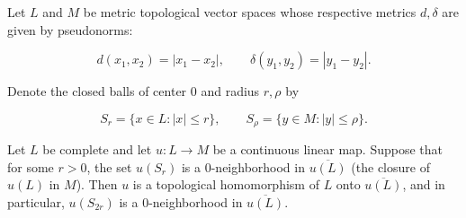 Let $L$ and $M$ be metric topological vector spaces whose respective metrics $d, \delta$ are given by pseudonorms:

$$d(x_1, x_2) = |x_1 - x_2|, \qquad \delta(y_1, y_2) = |y_1 - y_2|.$$

Denote the closed balls of center $0$ and radius $r, \rho$ by

$$S_r = \{x \in L: |x| \leq r\}, \qquad S_\rho = \{y \in M: |y| \leq \rho\}.$$

Let $L$ be complete and let $u: L \to M$ be a continuous linear map. Suppose that for some $r > 0$, the set $u(S_r)$ is a $0$-neighborhood in $\overline{u(L)}$ (the closure of $u(L)$ in $M$). Then $u$ is a topological homomorphism of $L$ onto $\overline{u(L)}$, and in particular, $u(S_{2r})$ is a $0$-neighborhood in $\overline{u(L)}$.
